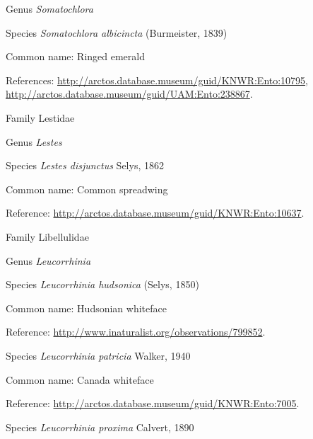 \documentclass[9pt, article]{memoir}
\begin{document}
\begin{multicols}{2}
\vspace{6pt}\noindent\hspace{30pt}Genus \textit{Somatochlora}


\vspace{6pt}\noindent\hspace{36pt}Species \textit{Somatochlora albicincta} (Burmeister, 1839)


Common name: Ringed emerald

References: 
\url{http://arctos.database.museum/guid/KNWR:Ento:10795}, 
\url{http://arctos.database.museum/guid/UAM:Ento:238867}.

\vspace{6pt}\noindent\hspace{24pt}Family Lestidae


\vspace{6pt}\noindent\hspace{30pt}Genus \textit{Lestes}


\vspace{6pt}\noindent\hspace{36pt}Species \textit{Lestes disjunctus} Selys, 1862


Common name: Common spreadwing

Reference: 
\url{http://arctos.database.museum/guid/KNWR:Ento:10637}.

\vspace{6pt}\noindent\hspace{24pt}Family Libellulidae


\vspace{6pt}\noindent\hspace{30pt}Genus \textit{Leucorrhinia}


\vspace{6pt}\noindent\hspace{36pt}Species \textit{Leucorrhinia hudsonica} (Selys, 1850)


Common name: Hudsonian whiteface

Reference: 
\url{http://www.inaturalist.org/observations/799852}.

\vspace{6pt}\noindent\hspace{36pt}Species \textit{Leucorrhinia patricia} Walker, 1940


Common name: Canada whiteface

Reference: 
\url{http://arctos.database.museum/guid/KNWR:Ento:7005}.

\vspace{6pt}\noindent\hspace{36pt}Species \textit{Leucorrhinia proxima} Calvert, 1890



\end{multicols}
\end{document}
